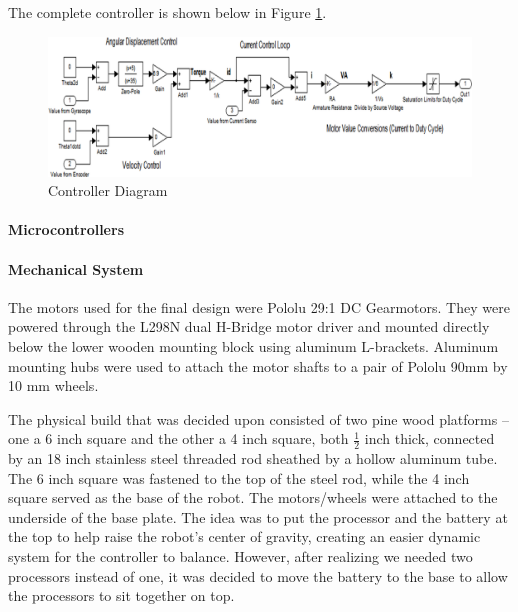 \documentclass[11pt]{report}
\begin{document}
\begin{spacing}{1.5}
The complete controller is shown below in Figure \ref{ControllerDiagram}.

\begin{figure}[H]
                \centering
                \includegraphics[width=\textwidth]{ControllerDiagram}
                \caption{Controller Diagram}
                \label{ControllerDiagram}
            \end{figure}
        
        \paragraph{Microcontrollers}
        
        \paragraph{Mechanical System}
        
        The motors used for the final design were Pololu 29:1 DC Gearmotors.  They were powered through the L298N dual H-Bridge motor driver and mounted directly below the lower wooden mounting block using aluminum L-brackets. Aluminum mounting hubs were used to attach the motor shafts to a pair of Pololu 90mm by 10 mm wheels. 
        
        The physical build that was decided upon consisted of two pine wood platforms – one a 6 inch square and the other a 4 inch square, both $\frac{1}{2}$ inch thick, connected by an 18 inch stainless steel threaded rod sheathed by a hollow aluminum tube. The 6 inch square was fastened to the top of the steel rod, while the 4 inch square served as the base of the robot. The motors/wheels were attached to the underside of the base plate. The idea was to put the processor and the battery at the top to help raise the robot’s center of gravity, creating an easier dynamic system for the controller to balance. However, after realizing we needed two processors instead of one, it was decided to move the battery to the base to allow the processors to sit together on top. 
        

\end{spacing}
\end{document}
